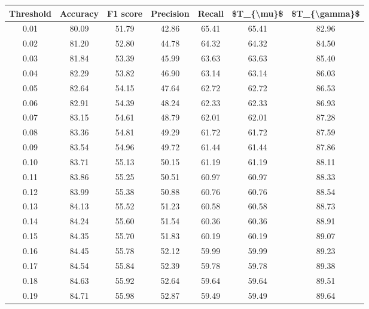 \begin{tabular}{|c|c|c|c|c|c|c|}
\hline
 Threshold &  Accuracy &  F1 score &  Precision &  Recall &  \$T\_\{\textbackslash mu\}\$ &  \$T\_\{\textbackslash gamma\}\$ \\
\hline
      0.01 &     80.09 &     51.79 &      42.86 &   65.41 &      65.41 &         82.96 \\
      0.02 &     81.20 &     52.80 &      44.78 &   64.32 &      64.32 &         84.50 \\
      0.03 &     81.84 &     53.39 &      45.99 &   63.63 &      63.63 &         85.40 \\
      0.04 &     82.29 &     53.82 &      46.90 &   63.14 &      63.14 &         86.03 \\
      0.05 &     82.64 &     54.15 &      47.64 &   62.72 &      62.72 &         86.53 \\
      0.06 &     82.91 &     54.39 &      48.24 &   62.33 &      62.33 &         86.93 \\
      0.07 &     83.15 &     54.61 &      48.79 &   62.01 &      62.01 &         87.28 \\
      0.08 &     83.36 &     54.81 &      49.29 &   61.72 &      61.72 &         87.59 \\
      0.09 &     83.54 &     54.96 &      49.72 &   61.44 &      61.44 &         87.86 \\
      0.10 &     83.71 &     55.13 &      50.15 &   61.19 &      61.19 &         88.11 \\
      0.11 &     83.86 &     55.25 &      50.51 &   60.97 &      60.97 &         88.33 \\
      0.12 &     83.99 &     55.38 &      50.88 &   60.76 &      60.76 &         88.54 \\
      0.13 &     84.13 &     55.52 &      51.23 &   60.58 &      60.58 &         88.73 \\
      0.14 &     84.24 &     55.60 &      51.54 &   60.36 &      60.36 &         88.91 \\
      0.15 &     84.35 &     55.70 &      51.83 &   60.19 &      60.19 &         89.07 \\
      0.16 &     84.45 &     55.78 &      52.12 &   59.99 &      59.99 &         89.23 \\
      0.17 &     84.54 &     55.84 &      52.39 &   59.78 &      59.78 &         89.38 \\
      0.18 &     84.63 &     55.92 &      52.64 &   59.64 &      59.64 &         89.51 \\
      0.19 &     84.71 &     55.98 &      52.87 &   59.49 &      59.49 &         89.64 \\

\end{tabular}
